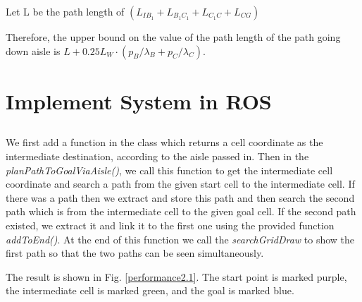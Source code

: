 \documentclass{article}
\begin{document}
Let L be the path length of $(L_{IB_{1}}  
			+ L_{B_{1}C_{1}} + L_{C_{1}C} 
			+ L_{CG} )$
			
Therefore, the upper bound on the value of the path length of the path going down aisle is $L+ 0.25L_{W}\cdot(p_{B} / \lambda_{B}   +  p_{C} / \lambda_{C})$.

\pagebreak
\section{Implement System in ROS}

\subsection{}

We first add a function in the class which returns a cell coordinate as the intermediate destination, according to the aisle passed in. Then in the \textit{planPathToGoalViaAisle()}, we call this function to get the intermediate cell coordinate and search a path from the given start cell to the intermediate cell. If there was a path then we extract and store this path and then search the second path which is from the intermediate cell to the given goal cell. If the second path existed, we extract it and link it to the first one using the provided function \textit{addToEnd()}. At the end of this function we call the \textit{searchGridDraw} to show the first path so that the two paths can be seen simultaneously.


The result is shown in Fig. \ref{performance2.1}. The start point is marked purple, the intermediate cell is marked green, and the goal is marked blue.
\end{document}
